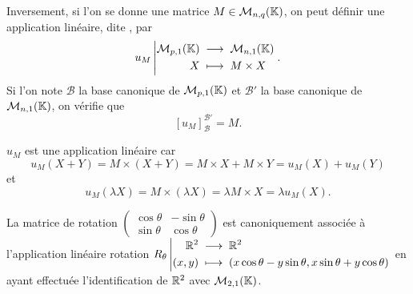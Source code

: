 \documentclass{book}
\begin{document}
\begin{DefinitionProposition}
Inversement, si l'on se donne une matrice $M \in   \mathcal{M}_{n,q}(\mathbb{K}) $,
on peut définir une application linéaire, dite , par
\[ {u_M}\left|\begin{aligned}{\mathcal{M}_{p,1}(\mathbb{K})}&\;\longrightarrow\;{\mathcal{M}_{n,1}(\mathbb{K})}\\{X}&\;\longmapsto\;{M\times X}\end{aligned}\right..\]
Si l'on note $\mathcal{B}$ la base canonique de $\mathcal{M}_{p,1}(\mathbb{K})$ et $\mathcal{B}'$ la base canonique de $\mathcal{M}_{n,1}(\mathbb{K})$,
on vérifie  que
\[ [u_M]_{\mathcal{B}}^{\mathcal{B}'} = M. \]
\end{DefinitionProposition}
\begin{Demonstration}
$u_M$ est  une application linéaire car $$u_M(X+Y)= M\times(X+Y)=M\times X + M\times Y=u_M(X)+u_M(Y)$$ et $$u_M(\lambda X)=M\times(\lambda X)=\lambda M\times X=\lambda u_M( X).$$ 
\end{Demonstration}
\begin{Exemple}
La matrice de rotation $\begin{pmatrix}\cos \theta & -\sin \theta\\ \sin \theta & \cos \theta\end{pmatrix}$ est canoniquement associée à l'application linéaire rotation ${R_\theta}\left|\begin{aligned}{\mathbb {R}^2 }&\;\longrightarrow\;{\mathbb {R}^2}\\{(x,y)}&\;\longmapsto\;{ (x\cos \theta - y \sin \theta,x\sin \theta + y \cos \theta)}\end{aligned}\right.$ en ayant effectuée l'identification de $\mathbb{R}^2$ avec $\mathcal{M}_{2,1}(\mathbb{K})$. 
\end{Exemple}
\end{document}
